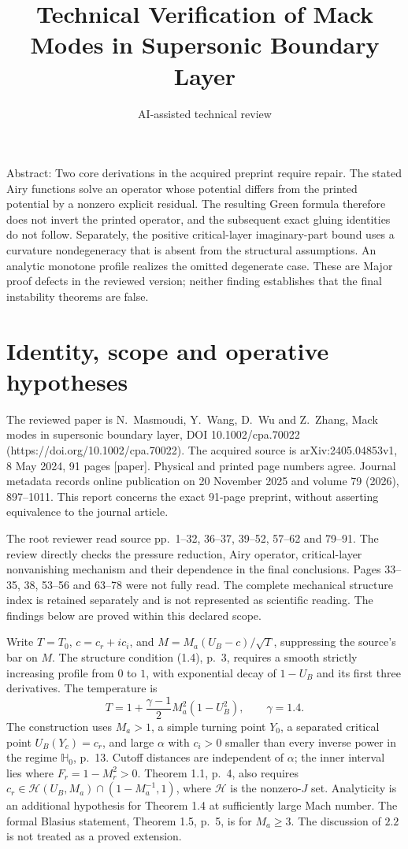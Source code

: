\documentclass[10pt]{article}
\title{Technical Verification of Mack Modes in Supersonic Boundary Layer}
\author{AI-assisted technical review}
\date{}
\begin{document}
\maketitle
Abstract: Two core derivations in the acquired preprint require repair. The stated Airy functions solve an operator whose potential differs from the printed potential by a nonzero explicit residual. The resulting Green formula therefore does not invert the printed operator, and the subsequent exact gluing identities do not follow. Separately, the positive critical-layer imaginary-part bound uses a curvature nondegeneracy that is absent from the structural assumptions. An analytic monotone profile realizes the omitted degenerate case. These are Major proof defects in the reviewed version; neither finding establishes that the final instability theorems are false.\par
\section*{Identity, scope and operative hypotheses}
The reviewed paper is N. Masmoudi, Y. Wang, D. Wu and Z. Zhang, Mack modes in supersonic boundary layer, DOI 10.1002/cpa.70022 (https://doi.org/10.1002/cpa.70022). The acquired source is arXiv:2405.04853v1, 8 May 2024, 91 pages [paper]. Physical and printed page numbers agree. Journal metadata records online publication on 20 November 2025 and volume 79 (2026), 897–1011. This report concerns the exact 91-page preprint, without asserting equivalence to the journal article.\par
The root reviewer read source pp. 1–32, 36–37, 39–52, 57–62 and 79–91. The review directly checks the pressure reduction, Airy operator, critical-layer nonvanishing mechanism and their dependence in the final conclusions. Pages 33–35, 38, 53–56 and 63–78 were not fully read. The complete mechanical structure index is retained separately and is not represented as scientific reading. The findings below are proved within this declared scope.\par
Write \(T=T_0\), \(c=c_r+ic_i\), and \(M=M_a(U_B-c)/\sqrt T\), suppressing the source’s bar on \(M\). The structure condition (1.4), p. 3, requires a smooth strictly increasing profile from \(0\) to \(1\), with exponential decay of \(1-U_B\) and its first three derivatives. The temperature is \[T=1+\frac{\gamma-1}{2}M_a^2(1-U_B^2),\qquad \gamma=1.4.\] The construction uses \(M_a>1\), a simple turning point \(Y_0\), a separated critical point \(U_B(Y_c)=c_r\), and large \(\alpha\) with \(c_i>0\) smaller than every inverse power in the regime \(\mathbb H_0\), p. 13. Cutoff distances are independent of \(\alpha\); the inner interval lies where \(F_r=1-M_r^2>0\). Theorem 1.1, p. 4, also requires \(c_r\in\mathcal H(U_B,M_a)\cap(1-M_a^{-1},1)\), where \(\mathcal H\) is the nonzero-\(J\) set. Analyticity is an additional hypothesis for Theorem 1.4 at sufficiently large Mach number. The formal Blasius statement, Theorem 1.5, p. 5, is for \(M_a\geq3\). The discussion of \(2.2\) is not treated as a proved extension.\par
\end{document}
